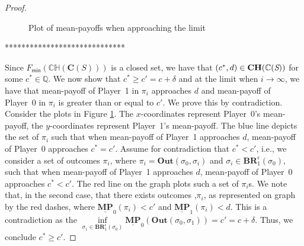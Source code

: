 \begin{proof}
\begin{figure}
    \centering
    \caption{Plot of mean-payoffs when approaching the limit}
    \label{fig:plot_mp_limit}
\end{figure}

*****************************

Since $F_{\mathsf{min}}(\mathbb{CH}(\mathbf{C}(S)))$ is a closed set, we have that $(c^*, d) \in \mathbf{CH(\mathbb{C}(\emph{S}))}$ for some $c^* \in \mathbb{Q}$. We now show that $c^* \geqslant c' = c+\delta$ and at the limit when $i\to \infty$, we have that mean-payoff of Player~1 in $\pi_i$ approaches $d$ and mean-payoff of Player~0 in $\pi_i$ is greater than or equal to $c'$. We prove this by contradiction. Consider the plots in Figure \ref{fig:plot_mp_limit}. The $x$-coordinates represent Player~0's mean-payoff, the $y$-coordinates represent Player~1's mean-payoff. The blue line depicts the set of $\pi_i$ such that when mean-payoff of Player~1 approaches $d$, mean-payoff of Player~0 approaches $c^* = c'$. Assume for contradiction that $c^* < c'$, i.e., we consider a set of outcomes $\pi_i$, where $\pi_i=\mathbf{Out}(\sigma_0, \sigma_i)$ and $\sigma_i \in \mathbf{BR}_1^{\epsilon}(\sigma_0)$, such that when mean-payoff of Player~1 approaches $d$, mean-payoff of Player~0 approaches $c^* < c'$. The red line on the graph plots such a set of $\pi_i$s. We note that, in the second case, that there exists outcomes ,$\pi_i$, as represented on graph by the red dashes, where $\underline{\mathbf{MP}}_0(\pi_i) < c'$ and $\underline{\mathbf{MP}}_1(\pi_i) < d$. This is a contradiction as the $\inf\limits_{\sigma_1 \in \mathbf{BR}_1^{\epsilon}(\sigma_0)} \underline{\mathbf{MP}}_0(\mathbf{Out}(\sigma_0, \sigma_1)) = c' = c + \delta$. Thus, we conclude $c^* \geqslant c'$. 


\end{proof}
